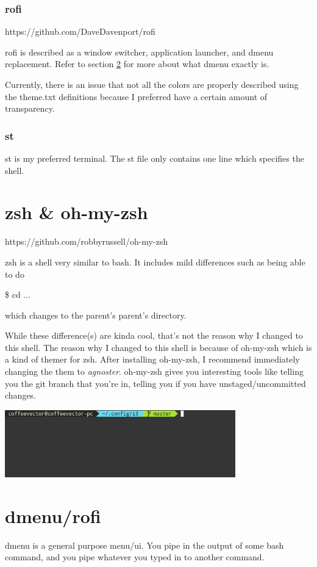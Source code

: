 \documentclass[letterpaper,12pt]{article}
\begin{document}
\subsubsection{rofi}
https://github.com/DaveDavenport/rofi
\par rofi is described as a window switcher, application launcher, and dmenu replacement.
Refer to section \ref{dmenu} for more about what dmenu exactly is.
\par Currently, there is an issue that not all the colors are properly described using the theme.txt definitions because I preferred have a certain amount of transparency.
\subsubsection{st}
\par st is my preferred terminal.
The st file only contains one line which specifies the shell.
\section{zsh \& oh-my-zsh}
https://github.com/robbyrussell/oh-my-zsh
\par zsh is a shell very similar to bash.
It includes mild differences such as being able to do
\begin{center}
	\$ cd ...
\end{center}
which changes to the parent's parent's directory.
\par While these difference(s) are kinda cool, that's not the reason why I changed to this shell.
The reason why I changed to this shell is because of oh-my-zsh which is a kind of themer for zsh.
After installing oh-my-zsh, I recommend immediately changing the them to \emph{agnoster}.
oh-my-zsh gives you interesting tools like telling you the git branch that you're in, telling you if you have unstaged/uncommitted changes.
\begin{center}
	\includegraphics[width=10cm]{./images/zsh.png}
\end{center}
\section{dmenu/rofi}\label{dmenu}
\par dmenu is a general purpose menu/ui.
You pipe in the output of some bash command, and you pipe whatever you typed in to another command.
\end{document}
